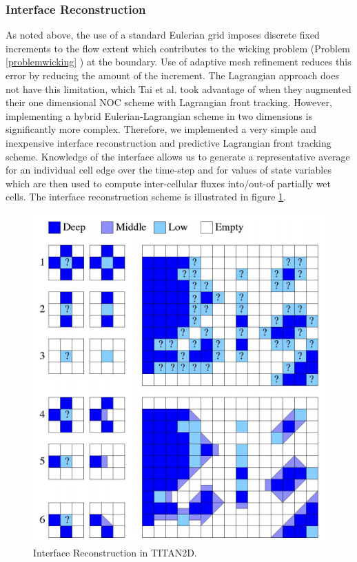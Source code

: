 \documentclass[review]{elsarticle}
\begin{document}
\subsubsection{Interface Reconstruction} \label{Interfacerecon}
As noted above, the use of a standard Eulerian grid imposes discrete 
fixed increments to the flow extent which contributes to the wicking problem
(Problem \ref{problemwicking} ) at the 
boundary.  Use of adaptive mesh refinement 
reduces this error by reducing the amount of the increment. 
The Lagrangian approach does not have this 
limitation, which Tai et al. \cite{Tai2002} took advantage
of when they augmented their one dimensional NOC scheme with 
Lagrangian front tracking.  However, implementing a hybrid 
Eulerian-Lagrangian scheme in two dimensions is significantly more 
complex. 
Therefore, %
we implemented a very 
simple and inexpensive interface reconstruction and predictive 
Lagrangian front tracking scheme.  Knowledge of the interface allows
us to generate a representative average for an individual cell edge 
over the time-step and for values of state variables which are then used to 
compute inter-cellular fluxes into/out-of partially wet cells.  The 
interface reconstruction scheme is illustrated in figure \ref{interface}.
\begin{figure}[!h]
        \centerline{\includegraphics[scale=0.3]{IMAGES/flux.png}}
        \caption{Interface Reconstruction in TITAN2D.}
        \label{interface}
\end{figure} 
\end{document}

